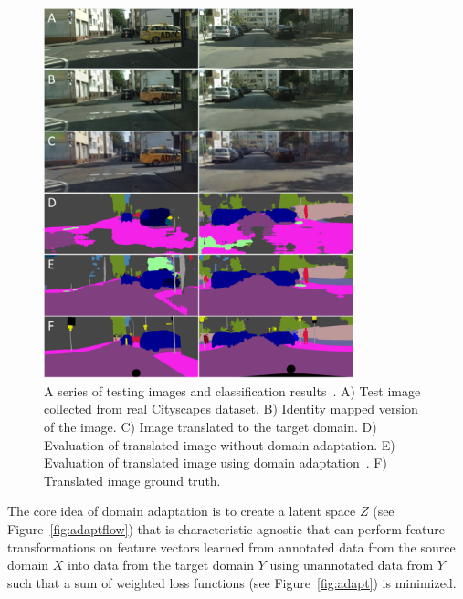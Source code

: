 \begin{figure}[ht!]
	\centering	\includegraphics[width=0.8\textwidth,keepaspectratio]{figs/street.png}
    \caption{A series of testing images and classification results~\cite{dadaptHRL}. A) Test image collected from real Cityscapes dataset. B) Identity mapped version of the image. C) Image translated to the target domain. D) Evaluation of translated image without domain adaptation. E) Evaluation of translated image using domain adaptation~\cite{dadaptHRL}. F) Translated image ground truth.}
\label{fig:street}      
\end{figure}

The core idea of domain adaptation is to create a latent space $Z$ (see Figure~\ref{fig:adaptflow}) that is characteristic agnostic that can perform feature transformations on feature vectors learned from annotated data from the source domain $X$ into data from the target domain $Y$ using unannotated data from $Y$ such that a sum of weighted loss functions (see Figure~\ref{fig:adapt}) is minimized.

